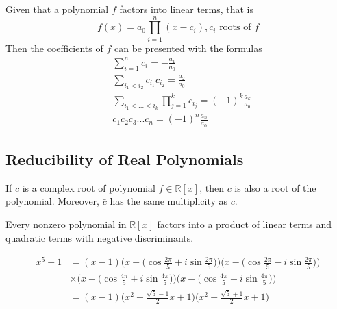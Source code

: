   \begin{theorem}
    Given that a polynomial $f$ factors into linear terms, that is 
    \begin{equation}
      f(x) = a_0 \prod_{i = 1}^{n} (x - c_i), c_i \text{ roots of } f
    \end{equation}
    Then the coefficients of $f$ can be presented with the formulas
    \begin{align*}
      & \sum_{i=1}^n c_i = - \frac{a_1}{a_0} \\
      & \sum_{i_1 < i_2} c_{i_1} c_{i_2} = \frac{a_2}{a_0} \\
      & \sum_{i_1< ...< i_k} \prod_{j = 1}^{k} c_{i_j} = (-1)^k \frac{a_k}{a_0} \\
      & c_1 c_2 c_3 ... c_n = (-1)^n \frac{a_n}{a_0}
    \end{align*}
  \end{theorem}

\subsection{Reducibility of Real Polynomials}

  \begin{theorem}
    If $c$ is a complex root of polynomial $f \in \mathbb{R}[x]$, then $\bar{c}$ is also a root of the polynomial. Moreover, $\bar{c}$ has the same multiplicity as $c$. 
  \end{theorem}

  \begin{corollary}
    Every nonzero polynomial in $\mathbb{R}[x]$ factors into a product of linear terms and quadratic terms with negative discriminants. 
  \end{corollary}

  \begin{example}
    \begin{align*}
      x^5 - 1 & = (x-1) \bigg( x - \Big( \cos{\frac{2\pi}{5}} + i \sin{\frac{2\pi}{5}}\Big) \bigg) \bigg( x - \Big( \cos{\frac{2\pi}{5}} - i \sin{\frac{2\pi}{5}}\Big) \bigg) \\
      & \times \bigg( x - \Big( \cos{\frac{4\pi}{5}} + i \sin{\frac{4\pi}{5}}\Big) \bigg) \bigg( x - \Big( \cos{\frac{4\pi}{5}} - i \sin{\frac{4\pi}{5}}\Big) \bigg) \\
      & = (x-1) \bigg( x^2 - \frac{\sqrt{5} - 1}{2} x + 1\bigg) \bigg( x^2 + \frac{\sqrt{5} + 1}{2} x + 1\bigg) 
    \end{align*}
  \end{example}

